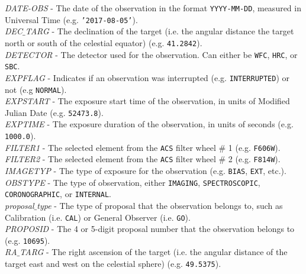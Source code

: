 \documentclass[10pt,journal,compsoc]{IEEEtran}
\begin{document}
\textit{DATE-OBS} - The date of the observation in the format \texttt{YYYY-MM-DD}, measured in Universal Time (e.g. \texttt{'2017-08-05'}).\\

\textit{DEC$\_$TARG} - The declination of the target (i.e. the angular distance the target north or south of the celestial equator) (e.g. \texttt{41.2842}).\\

\textit{DETECTOR} - The detector used for the observation.  Can either be \texttt{WFC}, \texttt{HRC}, or \texttt{SBC}.\\

\textit{EXPFLAG} - Indicates if an observation was interrupted (e.g. \texttt{INTERRUPTED}) or not (e.g \texttt{NORMAL}).\\

\textit{EXPSTART} - The exposure start time of the observation, in units of Modified Julian Date (e.g. \texttt{52473.8}).\\

\textit{EXPTIME} - The exposure duration of the observation, in units of seconds (e.g. \texttt{1000.0}).\\

\textit{FILTER1} - The selected element from the \texttt{ACS} filter wheel \# 1 (e.g. \texttt{F606W}).\\

\textit{FILTER2} - The selected element from the \texttt{ACS} filter wheel \# 2 (e.g. \texttt{F814W}).\\

\textit{IMAGETYP} - The type of exposure for the observation (e.g. \texttt{BIAS}, \texttt{EXT}, etc.).\\

\textit{OBSTYPE} - The type of observation, either \texttt{IMAGING}, \texttt{SPECTROSCOPIC}, \texttt{CORONOGRAPHIC}, or \texttt{INTERNAL}.\\

\textit{proposal$\_$type} - The type of proposal that the observation belongs to, such as Calibration (i.e. \texttt{CAL}) or General Observer (i.e. \texttt{GO}).\\

\textit{PROPOSID} - The 4 or 5-digit proposal number that the observation belongs to (e.g. \texttt{10695}).\\

\textit{RA$\_$TARG} - The right ascension of the target (i.e. the angular distance of the target east and west on the celestial sphere) (e.g. \texttt{49.5375}).\\
\end{document}
